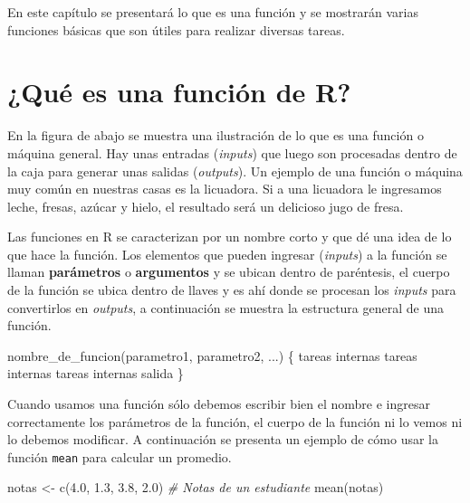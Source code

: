 \documentclass[
]{book}
\makeatletter
\newenvironment{Shaded}{\begin{snugshade}}{\end{snugshade}}
\newcommand{\CommentTok}[1]{\textcolor[rgb]{0.56,0.35,0.01}{\textit{#1}}}
\newcommand{\FloatTok}[1]{\textcolor[rgb]{0.00,0.00,0.81}{#1}}
\newcommand{\FunctionTok}[1]{\textcolor[rgb]{0.00,0.00,0.00}{#1}}
\newcommand{\NormalTok}[1]{#1}
\newcommand{\OtherTok}[1]{\textcolor[rgb]{0.56,0.35,0.01}{#1}}
\newenvironment{kframe}{%
\medskip{}
\setlength{\fboxsep}{.8em}
 \def\at@end@of@kframe{}%
 \ifinner\ifhmode%
  \def\at@end@of@kframe{\end{minipage}}%
  \begin{minipage}{\columnwidth}%
 \fi\fi%
 \def\FrameCommand##1{\hskip\@totalleftmargin \hskip-\fboxsep
 \colorbox{shadecolor}{##1}\hskip-\fboxsep
     \hskip-\linewidth \hskip-\@totalleftmargin \hskip\columnwidth}%
 \MakeFramed {\advance\hsize-\width
   \@totalleftmargin\z@ \linewidth\hsize
   \@setminipage}}%
 {\par\unskip\endMakeFramed%
 \at@end@of@kframe}
\renewenvironment{Shaded}{\begin{kframe}}{\end{kframe}}
\makeatother
\begin{document}
En este capítulo se presentará lo que es una función y se mostrarán varias funciones básicas que son útiles para realizar diversas tareas.

\hypertarget{quuxe9-es-una-funciuxf3n-de-r}{%
\section{¿Qué es una función de R?}\label{quuxe9-es-una-funciuxf3n-de-r}}

En la figura de abajo se muestra una ilustración de lo que es una función o máquina general. Hay unas entradas (\emph{inputs}) que luego son procesadas dentro de la caja para generar unas salidas (\emph{outputs}). Un ejemplo de una función o máquina muy común en nuestras casas es la licuadora. Si a una licuadora le ingresamos leche, fresas, azúcar y hielo, el resultado será un delicioso jugo de fresa.

Las funciones en R se caracterizan por un nombre corto y que dé una idea de lo que hace la función. Los elementos que pueden ingresar (\emph{inputs}) a la función se llaman \textbf{parámetros} o \textbf{argumentos} y se ubican dentro de paréntesis, el cuerpo de la función se ubica dentro de llaves y es ahí donde se procesan los \emph{inputs} para convertirlos en \emph{outputs}, a continuación se muestra la estructura general de una función.

\begin{Shaded}
\begin{Highlighting}[]
\FunctionTok{nombre\_de\_funcion}\NormalTok{(parametro1, parametro2, ...) \{}
\NormalTok{  tareas internas}
\NormalTok{  tareas internas}
\NormalTok{  tareas internas}
\NormalTok{  salida}
\NormalTok{\}}
\end{Highlighting}
\end{Shaded}

Cuando usamos una función sólo debemos escribir bien el nombre e ingresar correctamente los parámetros de la función, el cuerpo de la función ni lo vemos ni lo debemos modificar. A continuación se presenta un ejemplo de cómo usar la función \texttt{mean} para calcular un promedio.

\begin{Shaded}
\begin{Highlighting}[]
\NormalTok{notas }\OtherTok{\textless{}{-}} \FunctionTok{c}\NormalTok{(}\FloatTok{4.0}\NormalTok{, }\FloatTok{1.3}\NormalTok{, }\FloatTok{3.8}\NormalTok{, }\FloatTok{2.0}\NormalTok{)  }\CommentTok{\# Notas de un estudiante}
\FunctionTok{mean}\NormalTok{(notas)}
\end{Highlighting}
\end{Shaded}
\end{document}
